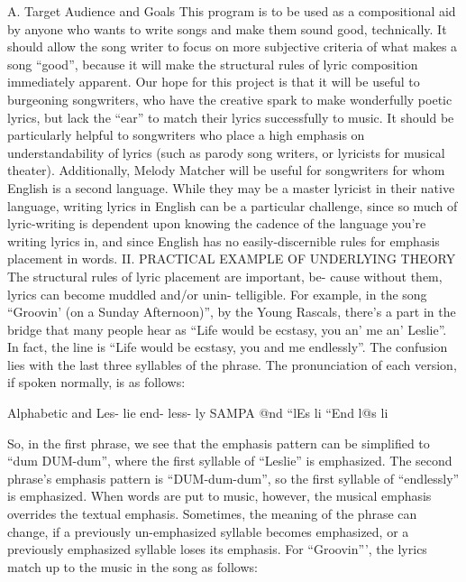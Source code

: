 \documentclass[10pt,oneside]{memoir}
\begin{document}
A. Target Audience and Goals
This program is to be used as a compositional aid by anyone who wants to write songs and make them sound good, technically. It should allow the song writer to focus on more subjective criteria of what makes a song ``good'', because it will make the structural rules of lyric composition immediately apparent.
Our hope for this project is that it will be useful to burgeoning songwriters, who have the creative spark to make wonderfully poetic lyrics, but lack the ``ear'' to match their lyrics successfully to music. It should be particularly helpful to songwriters who place a high emphasis on understandability of lyrics (such as parody song writers, or lyricists for musical theater).
Additionally, Melody Matcher will be useful for songwriters for whom English is a second language. While they may be a master lyricist in their native language, writing lyrics in English can be a particular challenge, since so much of lyric-writing is dependent upon knowing the cadence of the language you're writing lyrics in, and since English has no easily-discernible rules for emphasis placement in words.
II. PRACTICAL EXAMPLE OF UNDERLYING THEORY
The structural rules of lyric placement are important, be- cause without them, lyrics can become muddled and/or unin- telligible. For example, in the song ``Groovin' (on a Sunday Afternoon)'', by the Young Rascals, there's a part in the bridge that many people hear as ``Life would be ecstasy, you an' me an' Leslie''. In fact, the line is ``Life would be ecstasy, you and me endlessly''. The confusion lies with the last three syllables of the phrase. The pronunciation of each version, if spoken normally, is as follows:


Alphabetic
and       Les-   lie
end-       less-       ly
SAMPA
@nd   ``lEs     li
``End      l@s       li


So, in the first phrase, we see that the emphasis pattern can be simplified to ``dum DUM-dum'', where the first syllable of ``Leslie'' is emphasized. The second phrase's emphasis pattern is ``DUM-dum-dum'', so the first syllable of ``endlessly'' is emphasized.
When words are put to music, however, the musical emphasis overrides the textual emphasis. Sometimes, the meaning of the phrase can change, if a previously un-emphasized syllable becomes emphasized, or a previously emphasized syllable loses its emphasis.
For ``Groovin''', the lyrics match up to the music in the song as follows:
\begin{figure}
\begin{center}
\end{center}
\label{page2image5568.png}
\end{figure}
\end{document}
